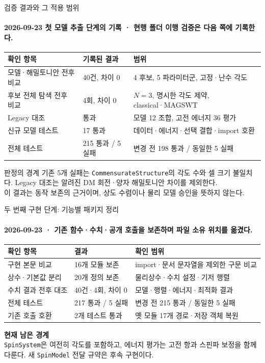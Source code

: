 \begin{frame}[label=verification]{검증 결과와 그 적용 범위}
  \framesubtitle{2026-09-23 첫 모델 추출 단계의 기록 · 현행 폴더 이행 검증은 다음 쪽에 기록한다.}
  \begin{tabularx}{\textwidth}{@{}p{4.0cm}p{2.7cm}Y@{}}
    \toprule
    확인 항목 & 기록된 결과 & 범위 \\
    \midrule
    모델·해밀토니안 전후 비교 & 40건, 차이 0 & 4 후보, 5 파라미터군, 고정·난수 각도 \\
    후보 전체 탐색 전후 비교 & 4회, 차이 0 & $N=3$, 명시한 각도 제약, classical·MAGSWT \\
    Legacy 대조 & 통과 & 모델 12 조합, 고전 에너지 36 평가 \\
    신규 모델 테스트 & 17 통과 & 데이터·에너지·선택 결합·import 호환 \\
    전체 테스트 & 215 통과 / 5 실패 & 변경 전 198 통과 / 동일한 5 실패 \\
    \bottomrule
  \end{tabularx}
  \medskip
  \begin{mdcallout}[warning]{판정의 경계}
    기존 5개 실패는 \texttt{CommensurateStructure}의 각도 수와 셀 크기 불일치다.
    Legacy 대조는 알려진 DM 회전·양자 해밀토니안 차이를 제외한다.\\
    이 결과는 동작 보존의 근거이며, 상도 수렴이나 물리 모델 승인을 뜻하지 않는다.
  \end{mdcallout}
\end{frame}

\begin{frame}[label=layout-verification]{두 번째 구현 단계: 기능별 패키지 정리}
  \framesubtitle{2026-09-23 · 기존 함수·수치·공개 호출을 보존하며 파일 소유 위치를 옮겼다.}
  \begin{tabularx}{\textwidth}{@{}p{3.4cm}p{3.1cm}Y@{}}
    \toprule
    확인 항목 & 결과 & 확인 범위 \\
    \midrule
    구현 본문 비교 & 16개 모듈 보존 & import·문서 문자열을 제외한 구문 비교 \\
    상수·기본값 분리 & 20개 정의 보존 & 물리상수·수치 설정·기저 행렬 \\
    수치 결과 전후 대조 & 40건·4회, 차이 0 & 모델·행렬·에너지·최적화 결과 \\
    전체 테스트 & 217 통과 / 5 실패 & 변경 전 215 통과 / 동일한 5 실패 \\
    기존 호출 호환 & 2개 테스트 통과 & 옛 모듈 17개 경로·저장 객체 복원 \\
    \bottomrule
  \end{tabularx}
  \par\medskip
  \textbf{현재 남은 경계}\\[0.4em]
  \texttt{SpinSystem}은 여전히 각도를 포함하고, 에너지 평가는 고전 항과
  스핀파 보정을 함께 다룬다. 새 \texttt{SpinModel} 전달 규약은 후속 구현이다.
\end{frame}

